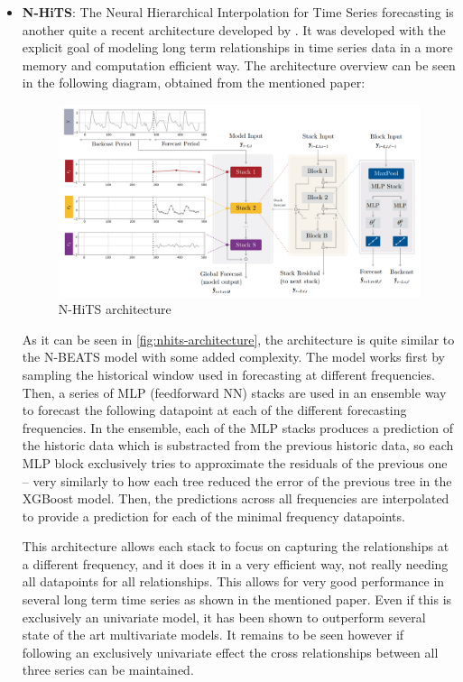 \begin{itemize}
    \item \textbf{N-HiTS}: The Neural Hierarchical Interpolation for Time Series forecasting is another quite a recent architecture developed by \cite{challu_olivares_oreshkin_garza_2022}. It was developed with the explicit goal of modeling long term relationships in time series data in a more memory and computation efficient way. The architecture overview can be seen in the following diagram, obtained from the mentioned paper:
    \begin{figure}[ht]
        \centering
        \captionsetup{justification=centering}
        \includegraphics[width=\linewidth]{assets/nhits-architecture.png}
        \caption{N-HiTS architecture}
        \label{fig:nhits-architecture}
    \end{figure}
    As it can be seen in \autoref{fig:nhits-architecture}, the architecture is quite similar to the N-BEATS model with some added complexity. The model works first by sampling the historical window used in forecasting at different frequencies. Then, a series of MLP (feedforward NN) stacks are used in an ensemble way to forecast the following datapoint at each of the different forecasting frequencies. In the ensemble, each of the MLP stacks produces a prediction of the historic data which is substracted from the previous historic data, so each MLP block exclusively tries to approximate the residuals of the previous one -- very similarly to how each tree reduced the error of the previous tree in the XGBoost model. Then, the predictions across all frequencies are interpolated to provide a prediction for each of the minimal frequency datapoints. 
    
    This architecture allows each stack to focus on capturing the relationships at a different frequency, and it does it in a very efficient way, not really needing all datapoints for all relationships. This allows for very good performance in several long term time series as shown in the mentioned paper. Even if this is exclusively an univariate model, it has been shown to outperform several state of the art multivariate models. It remains to be seen however if following an exclusively univariate effect the cross relationships between all three series can be maintained.
    

\end{itemize}
